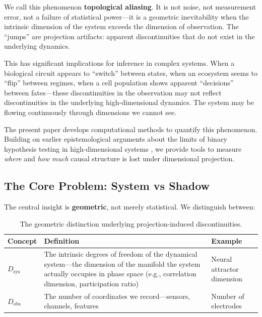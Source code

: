 \documentclass[12pt]{article}
\begin{document}
We call this phenomenon \textbf{topological aliasing}. It is not noise, not measurement error, not a failure of statistical power---it is a geometric inevitability when the intrinsic dimension of the system exceeds the dimension of observation. The ``jumps'' are projection artifacts: apparent discontinuities that do not exist in the underlying dynamics.

This has significant implications for inference in complex systems. When a biological circuit appears to ``switch'' between states, when an ecosystem seems to ``flip'' between regimes, when a cell population shows apparent ``decisions'' between fates---these discontinuities in the observation may not reflect discontinuities in the underlying high-dimensional dynamics. The system may be flowing continuously through dimensions we cannot see.

The present paper develops computational methods to quantify this phenomenon. Building on earlier epistemological arguments about the limits of binary hypothesis testing in high-dimensional systems \cite{todd2025limits}, we provide tools to measure \emph{where} and \emph{how much} causal structure is lost under dimensional projection.

\subsection{The Core Problem: System vs Shadow}

The central insight is \textbf{geometric}, not merely statistical. We distinguish between:

\begin{table}[h]
\centering
\begin{tabular}{@{}lp{7cm}p{4cm}@{}}
\toprule
\textbf{Concept} & \textbf{Definition} & \textbf{Example} \\
\midrule
$D_{\text{sys}}$ & The intrinsic degrees of freedom of the dynamical system---the dimension of the manifold the system actually occupies in phase space (e.g., correlation dimension, participation ratio) & Neural attractor dimension \\
\addlinespace
$D_{\text{obs}}$ & The number of coordinates we record---sensors, channels, features & Number of electrodes \\
\bottomrule
\end{tabular}
\caption{The geometric distinction underlying projection-induced discontinuities.}
\label{tab:dimensions}
\end{table}
\end{document}

